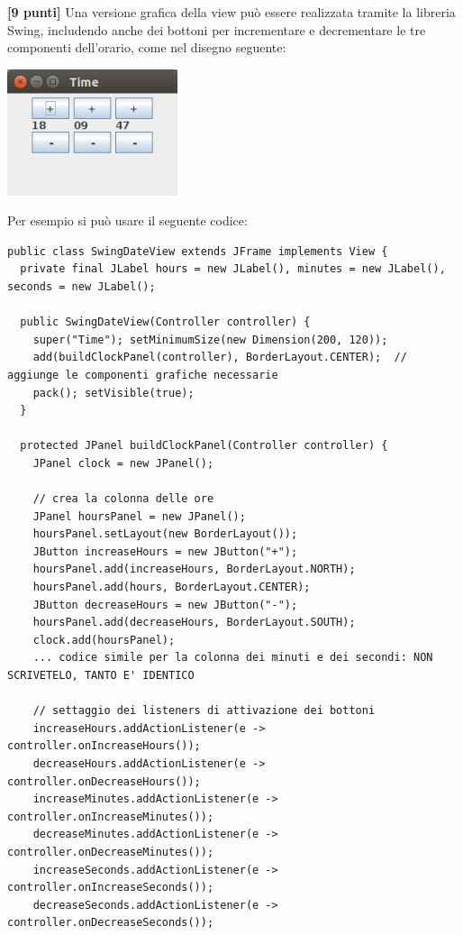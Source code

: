 \documentclass{article}[10pt]
\newcounter{esnu}
\newenvironment{esercizio}{\medskip \noindent {\bf Esercizio\addtocounter{esnu}{1} \arabic{esnu}}}{}
\begin{document}
\newpage
\begin{esercizio}\textbf{[9 punti]}
Una versione grafica della view pu\`o essere realizzata tramite la libreria Swing, includendo anche dei
bottoni per incrementare e decrementare le tre componenti dell'orario, come nel disegno seguente:

\begin{center}
\includegraphics[width=5cm]{SwingDateView}
\end{center}

\noindent
Per esempio si pu\`o usare il seguente codice:

{\scriptsize\begin{verbatim}
public class SwingDateView extends JFrame implements View {
  private final JLabel hours = new JLabel(), minutes = new JLabel(), seconds = new JLabel();

  public SwingDateView(Controller controller) {
    super("Time"); setMinimumSize(new Dimension(200, 120));
    add(buildClockPanel(controller), BorderLayout.CENTER);  // aggiunge le componenti grafiche necessarie
    pack(); setVisible(true);
  }

  protected JPanel buildClockPanel(Controller controller) {
    JPanel clock = new JPanel();

    // crea la colonna delle ore
    JPanel hoursPanel = new JPanel();
    hoursPanel.setLayout(new BorderLayout());
    JButton increaseHours = new JButton("+");
    hoursPanel.add(increaseHours, BorderLayout.NORTH);
    hoursPanel.add(hours, BorderLayout.CENTER);
    JButton decreaseHours = new JButton("-");
    hoursPanel.add(decreaseHours, BorderLayout.SOUTH);
    clock.add(hoursPanel);
    ... codice simile per la colonna dei minuti e dei secondi: NON SCRIVETELO, TANTO E' IDENTICO

    // settaggio dei listeners di attivazione dei bottoni
    increaseHours.addActionListener(e -> controller.onIncreaseHours());
    decreaseHours.addActionListener(e -> controller.onDecreaseHours());
    increaseMinutes.addActionListener(e -> controller.onIncreaseMinutes());
    decreaseMinutes.addActionListener(e -> controller.onDecreaseMinutes());
    increaseSeconds.addActionListener(e -> controller.onIncreaseSeconds());
    decreaseSeconds.addActionListener(e -> controller.onDecreaseSeconds());


\end{verbatim}}
\end{esercizio}
\end{document}
